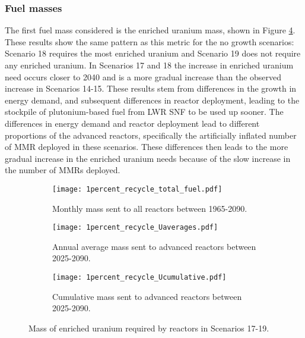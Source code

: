 \subsubsection{Fuel masses}
The first fuel mass considered is the enriched uranium mass, 
shown in Figure \ref{fig:1percent_recycle_uranium}. These results 
show the same pattern as this metric for the no growth scenarios:
Scenario 18 requires the most enriched uranium and Scenario 19 
does not require any enriched uranium. In Scenarios 17 and 18 the 
increase in enriched uranium need occurs closer to 2040 and is a 
more gradual increase than the observed increase in Scenarios 14-15. 
These results stem from differences in the growth in energy 
demand, and subsequent differences in reactor deployment, leading to the stockpile 
of plutonium-based fuel from \gls{LWR} \gls{SNF} to be used up sooner. 
The differences in energy demand and reactor deployment lead to different 
proportions of the advanced reactors, specifically the artificially
inflated number of \gls{MMR} deployed in these scenarios. These differences 
then leads to the more gradual increase in the enriched uranium needs
because of the slow increase in the number of \glspl{MMR} deployed.

\begin{figure}[h!]
    \centering
    \begin{subfigure}[b]{0.45\textwidth}
        \centering
        \texttt{[image: 1percent\_recycle\_total\_fuel.pdf]}
        \caption{Monthly mass sent to all reactors 
        between 1965-2090.}
        \label{fig:1percent_recycle_all_uranium}
    \end{subfigure}
    \hfill
    \begin{subfigure}[b]{0.45\textwidth}
        \centering
        \texttt{[image: 1percent\_recycle\_Uaverages.pdf]}
        \caption{Annual average mass sent to 
        advanced reactors between 2025-2090.}
        \label{fig:1percent_recycle_AR_uranium}
    \end{subfigure}
    \begin{subfigure}[b]{0.45\textwidth}
        \centering
        \texttt{[image: 1percent\_recycle\_Ucumulative.pdf]}
        \caption{Cumulative mass sent to advanced reactors between 2025-2090.}
        \label{fig:1percent_recycle_uranium_cumulative}
    \end{subfigure}
       \caption{Mass of enriched uranium required by reactors
        in Scenarios 17-19.}
       \label{fig:1percent_recycle_uranium}
\end{figure}

